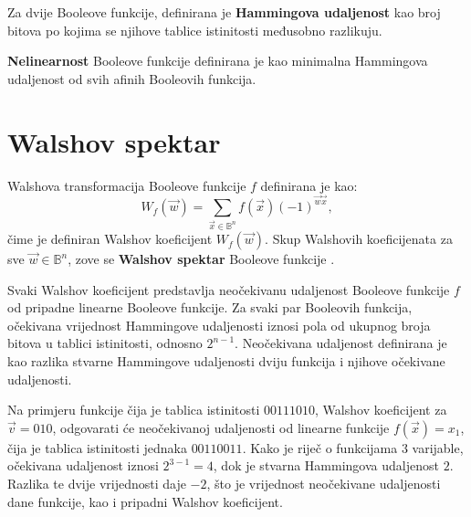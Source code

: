 Za dvije Booleove funkcije, definirana je \textbf{Hammingova udaljenost} kao broj bitova po kojima se njihove tablice istinitosti međusobno razlikuju.

\textbf{Nelinearnost} Booleove funkcije definirana je kao minimalna Hammingova udaljenost od svih afinih Booleovih funkcija.

\section {Walshov spektar}
Walshova transformacija Booleove funkcije $f$ definirana je kao:
\begin{equation}\label{eq:walsh transform}
    W_f(\vec{w}) = \sum_{\vec{x} \in \mathds{B}^n}f(\vec{x})(-1)^{\vec{w}\vec{x}},
\end{equation}
čime je definiran Walshov koeficijent $W_f(\vec{w})$.
Skup Walshovih koeficijenata za sve $\vec{w} \in \mathds{B}^n$, zove se \textbf{Walshov spektar} Booleove funkcije \cite{CryptographicBooleanFunctions}.

Svaki Walshov koeficijent predstavlja neočekivanu udaljenost  \cite{MeasuringBoolean} Booleove funkcije $f$ od pripadne linearne Booleove funkcije.
Za svaki par Booleovih funkcija, očekivana vrijednost Hammingove udaljenosti iznosi pola od ukupnog broja bitova u tablici istinitosti, odnosno $2^{n-1}$.
Neočekivana udaljenost definirana je kao razlika stvarne Hammingove udaljenosti dviju funkcija i njihove očekivane udaljenosti.

Na primjeru funkcije čija je tablica istinitosti $00111010$, Walshov koeficijent za $\vec{v} = 010$, odgovarati će neočekivanoj udaljenosti od linearne funkcije $f(\vec{x}) = x_1$, čija je tablica istinitosti jednaka $00110011$.
Kako je riječ o funkcijama $3$ varijable, očekivana udaljenost iznosi $2^{3-1} = 4$, dok je stvarna Hammingova udaljenost $2$.
Razlika te dvije vrijednosti daje $-2$, što je vrijednost neočekivane udaljenosti dane funkcije, kao i pripadni Walshov koeficijent.

